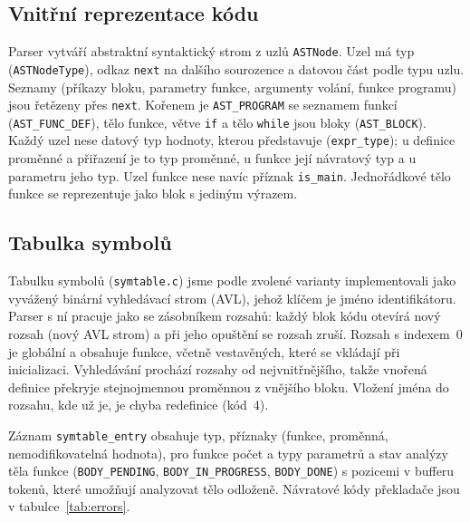\documentclass[11pt]{article}
\newcommand{\file}[1]{\texttt{#1}}                   %
\begin{document}
\subsection{Vnitřní reprezentace kódu}

Parser vytváří abstraktní syntaktický strom z uzlů \texttt{ASTNode}. Uzel má typ (\texttt{ASTNodeType}), odkaz \texttt{next} na dalšího sourozence a datovou část podle typu uzlu. Seznamy (příkazy bloku, parametry funkce, argumenty volání, funkce programu) jsou řetězeny přes \texttt{next}. Kořenem je \texttt{AST\_PROGRAM} se seznamem funkcí (\texttt{AST\_FUNC\_DEF}), tělo funkce, větve \texttt{if} a tělo \texttt{while} jsou bloky (\texttt{AST\_BLOCK}). Každý uzel nese datový typ hodnoty, kterou představuje (\texttt{expr\_type}); u definice proměnné a přiřazení je to typ proměnné, u funkce její návratový typ a u parametru jeho typ. Uzel funkce nese navíc příznak \texttt{is\_main}. Jednořádkové tělo funkce se reprezentuje jako blok s jediným výrazem.

\subsection{Tabulka symbolů}

Tabulku symbolů (\file{symtable.c}) jsme podle zvolené varianty implementovali jako vyvážený binární vyhledávací strom (AVL), jehož klíčem je jméno identifikátoru. Parser s ní pracuje jako se zásobníkem rozsahů: každý blok kódu otevírá nový rozsah (nový AVL strom) a při jeho opuštění se rozsah zruší. Rozsah s indexem~0 je globální a obsahuje funkce, včetně vestavěných, které se vkládají při inicializaci. Vyhledávání prochází rozsahy od nejvnitřnějšího, takže vnořená definice překryje stejnojmennou proměnnou z vnějšího bloku. Vložení jména do rozsahu, kde už je, je chyba redefinice (kód~4).

Záznam \texttt{symtable\_entry} obsahuje typ, příznaky (funkce, proměnná, nemodifikovatelná hodnota), pro funkce počet a typy parametrů a stav analýzy těla funkce (\texttt{BODY\_PENDING}, \texttt{BODY\_IN\_PROGRESS}, \texttt{BODY\_DONE}) s pozicemi v bufferu tokenů, které umožňují analyzovat tělo odloženě. Návratové kódy překladače jsou v tabulce~\ref{tab:errors}.
\end{document}

